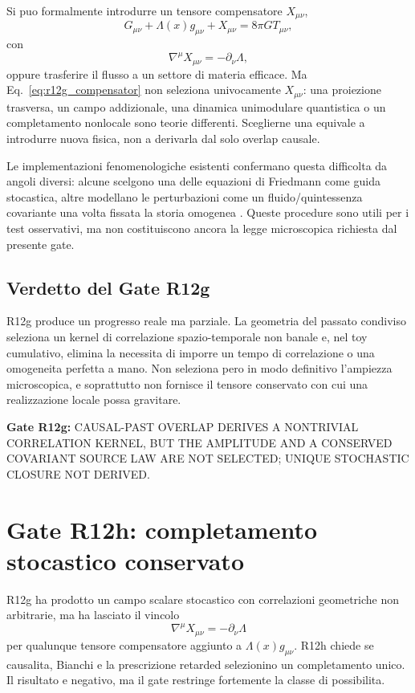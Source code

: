 \documentclass[11pt,a4paper]{article}
\newcommand{\status}[1]{\textsf{#1}}
\begin{document}
Si puo formalmente introdurre un tensore compensatore $X_{\mu\nu}$,
\begin{equation}
 G_{\mu\nu}+\Lambda(x)g_{\mu\nu}+X_{\mu\nu}=8\pi G T_{\mu\nu},
\end{equation}
con
\begin{equation}
 \nabla^\mu X_{\mu\nu}=-\partial_\nu\Lambda,
 \label{eq:r12g_compensator}
\end{equation}
oppure trasferire il flusso a un settore di materia efficace. Ma Eq.~\eqref{eq:r12g_compensator} non seleziona univocamente $X_{\mu\nu}$: una proiezione trasversa, un campo addizionale, una dinamica unimodulare quantistica o un completamento nonlocale sono teorie differenti. Sceglierne una equivale a introdurre nuova fisica, non a derivarla dal solo overlap causale.

Le implementazioni fenomenologiche esistenti confermano questa difficolta da angoli diversi: alcune scelgono una delle equazioni di Friedmann come guida stocastica, altre modellano le perturbazioni come un fluido/quintessenza covariante una volta fissata la storia omogenea \cite{AhmedSorkin2012,ZwaneAfshordiSorkin2017}. Queste procedure sono utili per i test osservativi, ma non costituiscono ancora la legge microscopica richiesta dal presente gate.

\subsection{Verdetto del Gate R12g}

R12g produce un progresso reale ma parziale. La geometria del passato condiviso seleziona un kernel di correlazione spazio-temporale non banale e, nel toy cumulativo, elimina la necessita di imporre un tempo di correlazione o una omogeneita perfetta a mano. Non seleziona pero in modo definitivo l'ampiezza microscopica, e soprattutto non fornisce il tensore conservato con cui una realizzazione locale possa gravitare.

\textbf{Gate R12g:} \status{CAUSAL-PAST OVERLAP DERIVES A NONTRIVIAL CORRELATION KERNEL, BUT THE AMPLITUDE AND A CONSERVED COVARIANT SOURCE LAW ARE NOT SELECTED; UNIQUE STOCHASTIC CLOSURE NOT DERIVED}.



\section{Gate R12h: completamento stocastico conservato}

R12g ha prodotto un campo scalare stocastico con correlazioni geometriche non arbitrarie, ma ha lasciato il vincolo
\begin{equation}
 \nabla^\mu X_{\mu\nu}=-\partial_\nu\Lambda
 \label{eq:r12h_compensator}
\end{equation}
per qualunque tensore compensatore aggiunto a $\Lambda(x)g_{\mu\nu}$. R12h chiede se causalita, Bianchi e la prescrizione retarded selezionino un completamento unico. Il risultato e negativo, ma il gate restringe fortemente la classe di possibilita.
\end{document}
